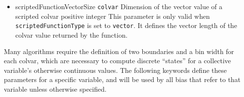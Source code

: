 {\begin{itemize}
 \item %
  \key
    {scriptedFunctionVectorSize}{%
    \texttt{colvar}}{%
    Dimension of the vector value of a scripted colvar}{%
    positive integer}{%
    This parameter is only valid when \texttt{scriptedFunctionType} is
    set to \texttt{vector}. It defines the vector length of the colvar value
    returned by the function.}
\end{itemize}
}\fi %




Many algorithms require the definition of two boundaries and a bin width for each colvar, which are necessary to compute discrete ``states'' for a collective variable's otherwise continuous values.
The following keywords define these parameters for a specific variable, and will be used by all bias that refer to that variable unless otherwise specified.

